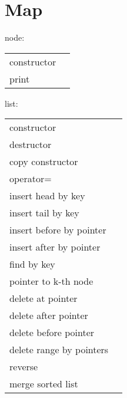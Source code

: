 \section{Map}

node:
\begin{longtable}{ll}
  constructor              & \\
  print                    & \\
\end{longtable}

list:
\begin{longtable}{ll}
  constructor              & \\
  destructor               & \\
  copy constructor         & \\
  operator=                & \\
  insert head by key       & \\
  insert tail by key       & \\
  insert before by pointer & \\
  insert after by pointer  & \\
  find by key              & \\
  pointer to k-th node     & \\
  delete at pointer        & \\
  delete after pointer     & \\
  delete before pointer    & \\
  delete range by pointers & \\
  reverse                  & \\
  merge sorted list        & \\
\end{longtable}
